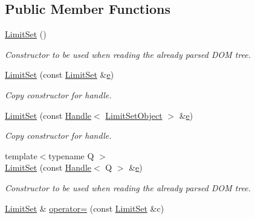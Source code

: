 \subsection*{Public Member Functions}
\begin{DoxyCompactItemize}
\item 
\hyperlink{class_d_d4hep_1_1_geometry_1_1_limit_set_a44077ffb973e104ce5175a1695b2d450}{Limit\+Set} ()
\begin{DoxyCompactList}\small\item\em Constructor to be used when reading the already parsed D\+OM tree. \end{DoxyCompactList}\item 
\hyperlink{class_d_d4hep_1_1_geometry_1_1_limit_set_a886be632405e18f3e90cbb0d886f2975}{Limit\+Set} (const \hyperlink{class_d_d4hep_1_1_geometry_1_1_limit_set}{Limit\+Set} \&\hyperlink{_volumes_8cpp_a8a9a1f93e9b09afccaec215310e64142}{e})
\begin{DoxyCompactList}\small\item\em Copy constructor for handle. \end{DoxyCompactList}\item 
\hyperlink{class_d_d4hep_1_1_geometry_1_1_limit_set_a53b9f8c03c205b3a628c03bf6592689a}{Limit\+Set} (const \hyperlink{class_d_d4hep_1_1_handle}{Handle}$<$ \hyperlink{class_d_d4hep_1_1_geometry_1_1_limit_set_object}{Limit\+Set\+Object} $>$ \&\hyperlink{_volumes_8cpp_a8a9a1f93e9b09afccaec215310e64142}{e})
\begin{DoxyCompactList}\small\item\em Copy constructor for handle. \end{DoxyCompactList}\item 
{\footnotesize template$<$typename Q $>$ }\\\hyperlink{class_d_d4hep_1_1_geometry_1_1_limit_set_a7832b9a0095954013a895d8987b01717}{Limit\+Set} (const \hyperlink{class_d_d4hep_1_1_handle}{Handle}$<$ Q $>$ \&\hyperlink{_volumes_8cpp_a8a9a1f93e9b09afccaec215310e64142}{e})
\begin{DoxyCompactList}\small\item\em Constructor to be used when reading the already parsed D\+OM tree. \end{DoxyCompactList}\item 
\hyperlink{class_d_d4hep_1_1_geometry_1_1_limit_set}{Limit\+Set} \& \hyperlink{class_d_d4hep_1_1_geometry_1_1_limit_set_a6590b625e57c2c92da40c8cf0528d45f}{operator=} (const \hyperlink{class_d_d4hep_1_1_geometry_1_1_limit_set}{Limit\+Set} \&c)

\end{DoxyCompactItemize}
